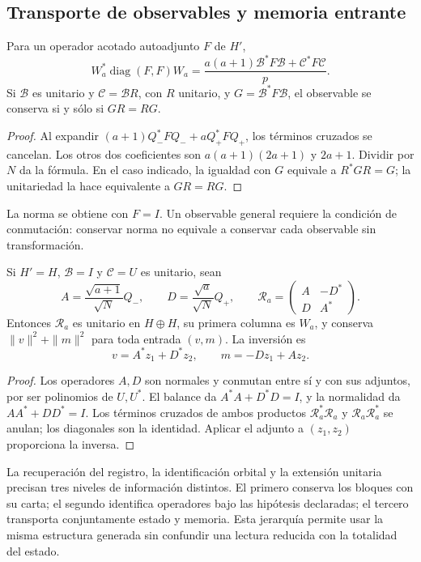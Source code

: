 \subsection{Transporte de observables y memoria entrante}
\label{iv:subsec:acoplamiento-lectores}

\begin{theorem}
\label{iv:thm:acoplamiento-lector}
Para un operador acotado autoadjunto \(F\) de \(H'\),
\[
 W_a^*\operatorname{diag}(F,F)W_a
 =\frac{a(a+1)\mathcal B^*F\mathcal B+\mathcal C^*F\mathcal C}{p}.
\]
Si \(\mathcal B\) es unitario y \(\mathcal C=\mathcal BR\), con
\(R\) unitario, y \(G=\mathcal B^*F\mathcal B\), el observable se
conserva si y sólo si \(GR=RG\).
\end{theorem}
\begin{proof}
Al expandir \((a+1)Q_-^*FQ_-+aQ_+^*FQ_+\), los términos cruzados
se cancelan. Los otros dos coeficientes son
\(a(a+1)(2a+1)\) y \(2a+1\). Dividir por \(N\) da la fórmula.
En el caso indicado, la igualdad con \(G\) equivale a \(R^*GR=G\);
la unitariedad la hace equivalente a \(GR=RG\).
\end{proof}

La norma se obtiene con \(F=I\). Un observable general requiere
la condición de conmutación: conservar norma no equivale a conservar
cada observable sin transformación.

\begin{theorem}
\label{iv:thm:acoplamiento-memoria}
Si \(H'=H\), \(\mathcal B=I\) y \(\mathcal C=U\) es unitario, sean
\[
 A=\frac{\sqrt{a+1}}{\sqrt N}Q_-,\qquad
 D=\frac{\sqrt a}{\sqrt N}Q_+,\qquad
 \mathscr R_a=\begin{pmatrix}A&-D^*\\D&A^*\end{pmatrix}.
\]
Entonces \(\mathscr R_a\) es unitario en \(H\oplus H\), su primera
columna es \(W_a\), y conserva \(\|v\|^2+\|m\|^2\) para toda
entrada \((v,m)\). La inversión es
\[
 v=A^*z_1+D^*z_2,\qquad m=-Dz_1+Az_2.
\]
\end{theorem}
\begin{proof}
Los operadores \(A,D\) son normales y conmutan entre sí y con sus
adjuntos, por ser polinomios de \(U,U^*\). El balance da
\(A^*A+D^*D=I\), y la normalidad da \(AA^*+DD^*=I\).
Los términos cruzados de ambos productos
\(\mathscr R_a^*\mathscr R_a\) y \(\mathscr R_a\mathscr R_a^*\)
se anulan; los diagonales son la identidad. Aplicar el adjunto a
\((z_1,z_2)\) proporciona la inversa.
\end{proof}

La recuperación del registro, la identificación orbital y la extensión
unitaria precisan tres niveles de información distintos. El primero
conserva los bloques con su carta; el segundo identifica operadores bajo
las hipótesis declaradas; el tercero transporta conjuntamente estado y
memoria. Esta jerarquía permite usar la misma estructura generada sin
confundir una lectura reducida con la totalidad del estado.
